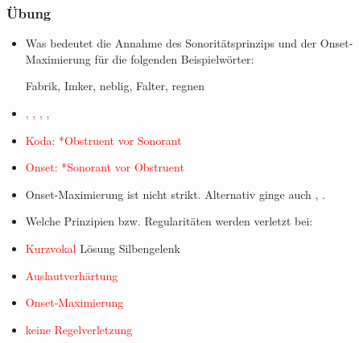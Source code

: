 
\begin{frame}
\frametitle{Übung}

\begin{itemize}
	\item Was bedeutet die Annahme des Sonoritätsprinzips und der Onset-Maximierung für die folgenden Beispielwörter:
	
	  \ea
          Fabrik, Imker, neblig, Falter, regnen
          \z
\end{itemize}	
\pause

	\begin{itemize}
		\item[] \textcolor{red}{\textipa{[fa:.b\textscr Ik]}, \textipa{[PIm.k5]},
                  \textipa{[ne:.blI\c{c}]}, \textipa{[fal.t5]}, \textipa{[\textscr e:.gn@n]}} 
	\item [] \textcolor{red}{Koda: *Obstruent vor Sonorant} 
	\item [] \textcolor{red}{Onset: *Sonorant vor Obstruent}

          \item Onset-Maximierung ist nicht strikt. Alternativ ginge auch \textipa{[ne:p.lI\c{c}]}, \textipa{[\textscr e:k.n@n]}.

	\end{itemize}

\begin{itemize}
	\item Welche Prinzipien bzw. Regularitäten werden verletzt bei:
\end{itemize}

\begin{minipage}{.3\textwidth}
	\eal
	\ex \textipa{[PE.b@]}
	\ex \textipa{[PEb.@]}
	\ex \textipa{[PEp.@]}
	\ex \textipa{[PEp.b@]}
        \zl
\end{minipage}
\pause
\begin{minipage}{.6\textwidth}
	\pause	
	\begin{itemize}
	\item[] \textcolor{red}{\ras Kurzvokal} Lösung \zb Silbengelenk \textipa{[PE\textsubdot{b}@]}
	\item[] \textcolor{red}{\ras Auslautverhärtung}
	\item[] \textcolor{red}{\ras Onset-Maximierung}
	\item[] \textcolor{red}{\ras keine Regelverletzung}
	\end{itemize}
	
\end{minipage}

\end{frame}



